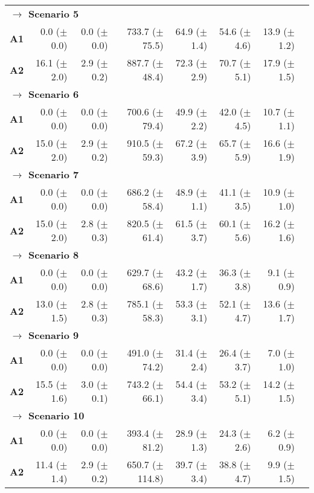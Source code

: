 \begin{table}[h]
\begin{tabular}{rrrrrrrr}
	\multicolumn{6}{l}{\textbf{$\longrightarrow$ Scenario 5 }} \\
\bf{A1}  & 0.0 ($\pm$0.0)  & 0.0 ($\pm$0.0)  & 733.7 ($\pm$75.5)  & 64.9 ($\pm$1.4)  & 54.6 ($\pm$4.6)  & 13.9 ($\pm$1.2)  \\
\bf{A2}  & 16.1 ($\pm$2.0)  & 2.9 ($\pm$0.2)  & 887.7 ($\pm$48.4)  & 72.3 ($\pm$2.9)  & 70.7 ($\pm$5.1)  & 17.9 ($\pm$1.5)  \\ [1ex]
	
	\multicolumn{6}{l}{\textbf{$\longrightarrow$ Scenario 6 }} \\
\bf{A1}  & 0.0 ($\pm$0.0)  & 0.0 ($\pm$0.0)  & 700.6 ($\pm$79.4)  & 49.9 ($\pm$2.2)  & 42.0 ($\pm$4.5)  & 10.7 ($\pm$1.1)  \\
\bf{A2}  & 15.0 ($\pm$2.0)  & 2.9 ($\pm$0.2)  & 910.5 ($\pm$59.3)  & 67.2 ($\pm$3.9)  & 65.7 ($\pm$5.9)  & 16.6 ($\pm$1.9)  \\ [1ex]
	
	\multicolumn{6}{l}{\textbf{$\longrightarrow$ Scenario 7 }} \\
\bf{A1}  & 0.0 ($\pm$0.0)  & 0.0 ($\pm$0.0)  & 686.2 ($\pm$58.4)  & 48.9 ($\pm$1.1)  & 41.1 ($\pm$3.5)  & 10.9 ($\pm$1.0)  \\
\bf{A2}  & 15.0 ($\pm$2.0)  & 2.8 ($\pm$0.3)  & 820.5 ($\pm$61.4)  & 61.5 ($\pm$3.7)  & 60.1 ($\pm$5.6)  & 16.2 ($\pm$1.6)  \\ [1ex]
	
	\multicolumn{6}{l}{\textbf{$\longrightarrow$ Scenario 8 }} \\
\bf{A1}  & 0.0 ($\pm$0.0)  & 0.0 ($\pm$0.0)  & 629.7 ($\pm$68.6)  & 43.2 ($\pm$1.7)  & 36.3 ($\pm$3.8)  & 9.1 ($\pm$0.9)  \\
\bf{A2}  & 13.0 ($\pm$1.5)  & 2.8 ($\pm$0.3)  & 785.1 ($\pm$58.3)  & 53.3 ($\pm$3.1)  & 52.1 ($\pm$4.7)  & 13.6 ($\pm$1.7)  \\ [1ex]
	
	\multicolumn{6}{l}{\textbf{$\longrightarrow$ Scenario 9 }} \\
\bf{A1}  & 0.0 ($\pm$0.0)  & 0.0 ($\pm$0.0)  & 491.0 ($\pm$74.2)  & 31.4 ($\pm$2.4)  & 26.4 ($\pm$3.7)  & 7.0 ($\pm$1.0)  \\
\bf{A2}  & 15.5 ($\pm$1.6)  & 3.0 ($\pm$0.1)  & 743.2 ($\pm$66.1)  & 54.4 ($\pm$3.4)  & 53.2 ($\pm$5.1)  & 14.2 ($\pm$1.5)  \\ [1ex]
	
	\multicolumn{6}{l}{\textbf{$\longrightarrow$ Scenario 10 }} \\
		
\bf{A1}  & 0.0 ($\pm$0.0)  & 0.0 ($\pm$0.0)  & 393.4 ($\pm$81.2)  & 28.9 ($\pm$1.3)  & 24.3 ($\pm$2.6)  & 6.2 ($\pm$0.9)  \\
\bf{A2}  & 11.4 ($\pm$1.4)  & 2.9 ($\pm$0.2)  & 650.7 ($\pm$114.8)  & 39.7 ($\pm$3.4)  & 38.8 ($\pm$4.7)  & 9.9 ($\pm$1.5)  \\ [1ex]
		\hline
	\end{tabular}
\end{table} 
